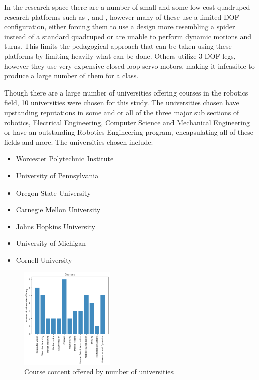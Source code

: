 \documentclass[conference]{IEEEtran}
\begin{document}
In the research space there are a number of small and some low cost quadruped research platforms such as \cite{Aracna}, \cite{shkolnik2010motion} and \cite{77248}, however many of these use a limited DOF configuration, either forcing them to use a design more resembling a spider \cite{Aracna} instead of a standard quadruped or are unable to perform dynamic motions and turns. This limits the pedagogical approach that can be taken using these platforms by limiting heavily what can be done. Others utilize 3 DOF legs, however they use very expensive closed loop servo motors, making it infeasible to produce a large number of them for a class.


Though there are a large number of universities offering courses in the robotics field, 10 universities were chosen for this study. The universities chosen have upstanding reputations in some and or all of the three major sub sections of robotics, Electrical Engineering, Computer Science and Mechanical Engineering or have an outstanding Robotics Engineering program, encapsulating all of these fields and more. The universities chosen include:


\begin{itemize}
     \item Worcester Polytechnic Institute\cite{wpiCourses}
    \item University of Pennsylvania\cite{uPennCourses}
    \item Oregon State University\cite{OreganStateCourses}
    \item Carnegie Mellon University\cite{CMUCourses}
    \item Johns Hopkins University\cite{JHUCourses}
    \item University of Michigan \cite{UMCourses}
    \item Cornell University\cite{CornellCourses}
\end{itemize}
\begin{figure}[H]
	\centering
      \includegraphics[width=0.4\textwidth]{Images/CourseOfferings.png}
  	\caption{Course content offered by number of universities}
\end{figure}
\end{document}
